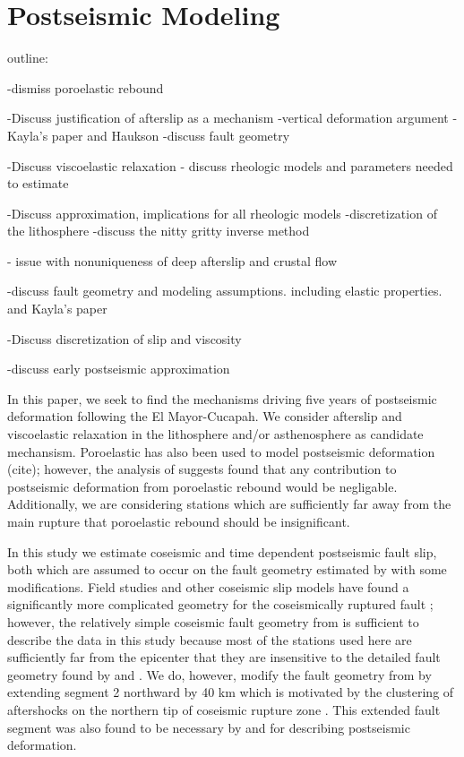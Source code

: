 \documentclass[12pt]{article}
\begin{document}
\section*{Postseismic Modeling}

outline:

-dismiss poroelastic rebound

-Discuss justification of afterslip as a mechanism
 -vertical deformation argument
 -Kayla's paper and Haukson
 -discuss fault geometry
 
-Discuss viscoelastic relaxation
  - discuss rheologic models and parameters needed to estimate

-Discuss approximation, implications for all rheologic models
-discretization of the lithosphere
-discuss the nitty gritty inverse method

- issue with nonuniqueness of deep afterslip and crustal flow

-discuss fault geometry and modeling assumptions. including elastic properties. and Kayla's paper

-Discuss discretization of slip and viscosity

-discuss early postseismic approximation

In this paper, we seek to find the mechanisms driving five years of postseismic deformation following the El Mayor-Cucapah. We consider afterslip and viscoelastic relaxation in the lithosphere and/or asthenosphere as candidate mechansism.  Poroelastic has also been used to model postseismic deformation (cite); however, the analysis of \cite{Gonzalez-ortega2014} suggests found that any contribution to postseismic deformation from poroelastic rebound would be negligable.  Additionally, we are considering stations which are sufficiently far away from the main rupture that poroelastic rebound should be insignificant.  

In this study we estimate coseismic and time dependent postseismic fault slip, both which are assumed to occur on the fault geometry estimated by \cite{Wei2011a} with some modifications.  Field studies and other coseismic slip models have found a significantly more complicated geometry for the coseismically ruptured fault \cite{Fletcher2009} \cite{Oskin2012}; however, the relatively simple coseismic fault geometry from \cite{Wei2011a} is sufficient to describe the data in this study because most of the stations used here are sufficiently far from the epicenter that they are insensitive to the detailed fault geometry found by \cite{Fletcher2009} and \cite{Oskin2012}. We do, however, modify the fault geometry from \cite{Wei2011a} by extending segment 2 northward by 40 km which is motivated by the clustering of aftershocks on the northern tip of coseismic rupture zone \cite{Kroll2013} \cite{Hauksson2011}. This extended fault segment was also found to be necessary by \cite{Rollins2015} and \cite{Pollitz2012} for describing postseismic deformation.     
\end{document}
